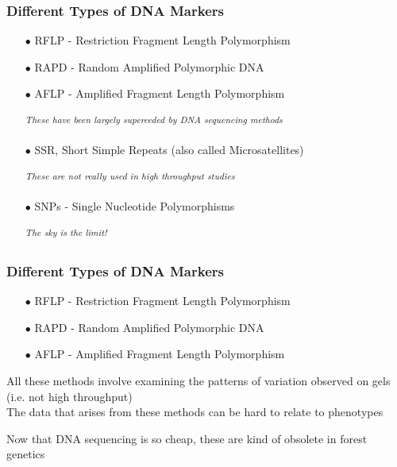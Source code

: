 \documentclass{beamer}
\begin{document}
\begin{frame}

\frametitle{Different Types of DNA Markers}

\begin{itemize}
	\item[$\bullet$] RFLP - Restriction Fragment Length Polymorphism 
	
	\item[$\bullet$] RAPD - Random Amplified Polymorphic DNA
	\item[$\bullet$] AFLP -  Amplified Fragment Length Polymorphism
	\item[] \textsuperscript{\textit{These have been largely superceded by DNA sequencing methods}}
	\vspace{20pt}
	\item[$\bullet$] SSR, Short Simple Repeats (also called Microsatellites)
	\item[] \textsuperscript{\textit{These are not really used in high throughput studies}}
	\vspace{20pt}
	\item[$\bullet$]  SNPs - Single Nucleotide Polymorphisms
	\item[] \textsuperscript{\textit{The sky is the limit!}}
\end{itemize}


\end{frame}






\begin{frame}
	
	\frametitle{Different Types of DNA Markers}
	
	\begin{itemize}
		\item[$\bullet$] RFLP - Restriction Fragment Length Polymorphism 
		
		\item[$\bullet$] RAPD - Random Amplified Polymorphic DNA
		\item[$\bullet$] AFLP -  Amplified Fragment Length Polymorphism
		
	\end{itemize}
	\vspace{15pt}
	All these methods involve examining the patterns of variation observed on gels (i.e. not high throughput) \\
	The data that arises from these methods can be hard to relate to phenotypes \\
	
	\vspace{20pt}
	
	Now that DNA sequencing is so cheap, these are kind of obsolete in forest genetics
\end{frame}
\end{document}
